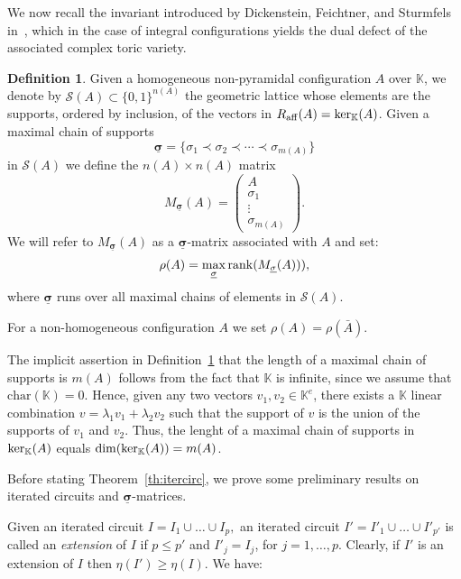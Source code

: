 \documentclass[11pt]{amsart}
\theoremstyle{plain}
\theoremstyle{definition}
\newtheorem{definition}[theorem]{Definition}
\theoremstyle{remark}
\newcommand{\Script}[1]{\ensuremath{{\mathcal{#1}}}}
\newcommand{\ScS}{\Script{S}}
\renewcommand{\k}{{\mathbb K}}
\newcommand{\csig}{\ensuremath{\underline{\mathbf \sigma}}}
\numberwithin{equation}{section}
\begin{document}
We now recall the invariant introduced  by Dickenstein, Feichtner, and Sturmfels in~\cite{DFS}, which
 in the case of integral configurations yields the dual defect of the associated complex toric variety.
\begin{definition} \label{def:DFS}
Given a homogeneous non-pyramidal configuration $A$ over $\k$,
we denote by $\ScS(A)\subset \{0,1\}^{n(A)}$  the geometric lattice whose elements are the   supports, 
  ordered by inclusion, of the vectors in $R_{\rm aff} (A) = {\rm ker}_\k({A})$.  
  Given a maximal chain of  supports
  $$\csig = \{\sigma_1 \prec \sigma_2 \prec \cdots \prec \sigma_{m(A)}\} $$
  in $\ScS(A)$ we define the $n(A)\times n(A)$  matrix
  $$M_{\csig}(A) = \left(\begin{array}{c}  A \\\sigma_1 \\\vdots \\ \sigma_{m(A)}\end{array}\right).$$
 We will refer to $M_{\csig}(A)$ as a $\csig$-matrix associated with $A$ and set:
 \begin{equation}\label{eq:rho}
 \rho(A) = \max_{\csig} {\rm rank} (M_{\csig}(A))),
 \end{equation}
 where $\csig$ runs over all maximal chains of  elements in $\ScS(A)$. 
 
 For a non-homogeneous configuration $A$ we set $\rho(A) = \rho(\bar{A})$.
 \end{definition}

The implicit assertion in Definition~\ref{def:DFS} that the length of a maximal chain of supports is $m(A)$ 
follows from the fact that $\k$ is infinite, since we assume that ${\mathrm{char}}(\k) = 0$. 
  Hence, given any two vectors $v_1, v_2\in \k^e$, there exists
a $\k$ linear combination $v=\lambda_1 v_1 + \lambda_2 v_2$ such that the support of $v$ is the union of the supports of $v_1$ and $v_2$.  
Thus, the lenght of a maximal chain of supports in  ${\rm ker}_\k({A})$ equals $\dim ({\rm ker}_\k({A})) = m(A)$. 

\medskip

Before stating Theorem~\ref{th:itercirc},
 we prove some preliminary results on iterated circuits and $\csig$-matrices.

Given an iterated circuit 
$I=I_1 \cup \dots \cup I_p,$
an iterated circuit $I' = I'_1 \cup \dots \cup I'_{p'}$ is called an {\em extension} of 
$I$ if  $p \le p'$ and $I'_j = I_j$, for $j=1,\dots, p$.  Clearly, if $I'$ is an extension of $I$ then $\eta(I') \geq \eta(I)$.
We have:
\end{document}
